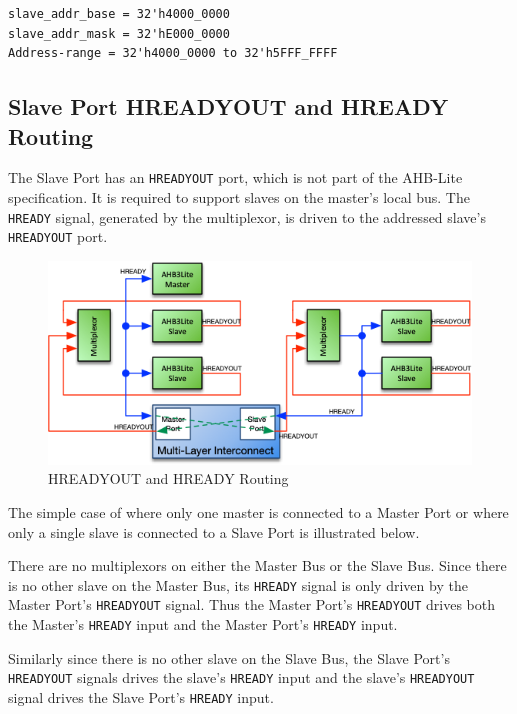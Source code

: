 \begin{verbatim}
slave_addr_base = 32'h4000_0000
slave_addr_mask = 32'hE000_0000
Address-range = 32'h4000_0000 to 32'h5FFF_FFFF
\end{verbatim}

\subsection{Slave Port HREADYOUT and HREADY
Routing}\label{slave-port-hreadyout-and-hready-routing}

The Slave Port has an \texttt{HREADYOUT} port, which is not part of the AHB-Lite
specification. It is required to support slaves on the master's local
bus. The \texttt{HREADY} signal, generated by the multiplexor, is driven to the
addressed slave's \texttt{HREADYOUT} port.

\begin{figure}[htb]
	\centering
	\includegraphics[]{assets/img/ahb-lite-switch-sys4}
	\caption{HREADYOUT and HREADY Routing}
	\label{fig:hready-hready-routing}
\end{figure}

The simple case of where only one master is connected to a Master Port
or where only a single slave is connected to a Slave Port is illustrated
below.

There are no multiplexors on either the Master Bus or the Slave Bus.
Since there is no other slave on the Master Bus, its \texttt{HREADY} signal is
only driven by the Master Port's \texttt{HREADYOUT} signal. Thus the Master
Port's \texttt{HREADYOUT} drives both the Master's \texttt{HREADY} input and the Master
Port's \texttt{HREADY} input.

Similarly since there is no other slave on the Slave Bus, the Slave
Port's \texttt{HREADYOUT} signals drives the slave's \texttt{HREADY} input and the slave's
\texttt{HREADYOUT} signal drives the Slave Port's \texttt{HREADY} input.

